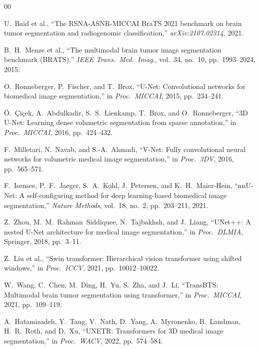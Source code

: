 \documentclass[conference]{IEEEtran}
\begin{document}
\begin{thebibliography}{00}

U.~Baid et al., ``The RSNA-ASNR-MICCAI BraTS 2021 benchmark on brain
tumor segmentation and radiogenomic classification,''
\textit{arXiv:2107.02314}, 2021.

B.~H.~Menze et al., ``The multimodal brain tumor image segmentation
benchmark (BRATS),'' \textit{IEEE Trans.\ Med.\ Imag.}, vol.~34,
no.~10, pp.~1993--2024, 2015.

O.~Ronneberger, P.~Fischer, and T.~Brox, ``U-Net: Convolutional
networks for biomedical image segmentation,'' in \textit{Proc.\
MICCAI}, 2015, pp.~234--241.

\"{O}.~\c{C}i\c{c}ek, A.~Abdulkadir, S.~S.~Lienkamp, T.~Brox, and
O.~Ronneberger, ``3D U-Net: Learning dense volumetric segmentation
from sparse annotation,'' in \textit{Proc.\ MICCAI}, 2016,
pp.~424--432.

F.~Milletari, N.~Navab, and S.-A.~Ahmadi, ``V-Net: Fully convolutional
neural networks for volumetric medical image segmentation,'' in
\textit{Proc.\ 3DV}, 2016, pp.~565--571.

F.~Isensee, P.~F.~Jaeger, S.~A.~Kohl, J.~Petersen, and
K.~H.~Maier-Hein, ``nnU-Net: A self-configuring method for
deep learning-based biomedical image segmentation,''
\textit{Nature Methods}, vol.~18, no.~2, pp.~203--211, 2021.

Z.~Zhou, M.~M.~Rahman~Siddiquee, N.~Tajbakhsh, and J.~Liang,
``UNet++: A nested U-Net architecture for medical image
segmentation,'' in \textit{Proc.\ DLMIA}, Springer, 2018,
pp.~3--11.

Z.~Liu et al., ``Swin transformer: Hierarchical vision transformer
using shifted windows,'' in \textit{Proc.\ ICCV}, 2021,
pp.~10012--10022.

W.~Wang, C.~Chen, M.~Ding, H.~Yu, S.~Zha, and J.~Li,
``TransBTS: Multimodal brain tumor segmentation using
transformer,'' in \textit{Proc.\ MICCAI}, 2021, pp.~109--119.

A.~Hatamizadeh, Y.~Tang, V.~Nath, D.~Yang, A.~Myronenko,
B.~Landman, H.~R.~Roth, and D.~Xu, ``UNETR: Transformers for
3D medical image segmentation,'' in \textit{Proc.\ WACV}, 2022,
pp.~574--584.


\end{thebibliography}
\end{document}
